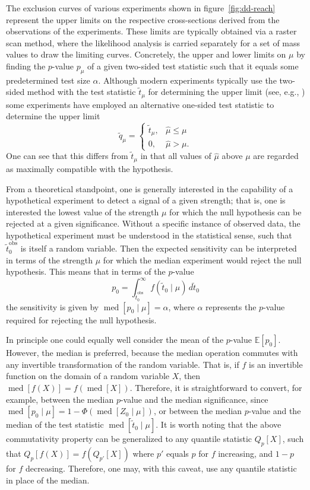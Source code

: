 \documentclass[b5paper, 10pt, twoside]{book}
\newcommand{\difd}{\,d}
\DeclareMathOperator{\med}{med}
\begin{document}
The exclusion curves of various experiments shown in figure~\ref{fig:dd-reach} represent the upper limits on the respective cross-sections derived from the observations of the experiments. These limits are typically obtained via a raster scan method, where the likelihood analysis is carried separately for a set of mass values to draw the limiting curves. Concretely, the upper and lower limits on $\mu$ by finding the $p$-value $p_\mu$ of a given two-sided test statistic such that it equals some predetermined test size $\alpha$. Although modern experiments typically use the two-sided method with the test statistic $\tilde{t}_\mu$ for determining the upper limit (see, e.g., \textcites{XENON2019b, PandaX2021, LZ2024}) some experiments have employed an alternative one-sided test statistic to determine the upper limit \parencite{CowanEtAl2011}
\begin{equation}
\tilde{q}_\mu=
\begin{cases}
\tilde{t}_\mu,&\hat{\mu}\leq\mu\\
0,&\hat{\mu}>\mu.
\end{cases}
\end{equation}
One can see that this differs from $\tilde{t}_\mu$ in that all values of $\hat{\mu}$ above $\mu$ are regarded as maximally compatible with the hypothesis.

From a theoretical standpoint, one is generally interested in the capability of a hypothetical experiment to detect a signal of a given strength; that is, one is interested the lowest value of the strength $\mu$ for which the null hypothesis can be rejected at a given significance. Without a specific instance of observed data, the hypothetical experiment must be understood in the statistical sense, such that $\tilde{t}_0^\text{obs}$ is itself a random variable. Then the expected sensitivity can be interpreted in terms of the strength $\mu$ for which the median experiment would reject the null hypothesis. This means that in terms of the $p$-value
\begin{equation}
p_0=\int_{\tilde{t}_0^\text{obs}}^\infty f(\tilde{t}_0\mid\mu)\difd\tilde{t}_0
\end{equation}
the sensitivity is given by $\med[p_0\mid\mu]=\alpha$, where $\alpha$ represents the $p$-value required for rejecting the null hypothesis.

In principle one could equally well consider the mean of the $p$-value $\mathbb{E}[p_0]$. However, the median is preferred, because the median operation commutes with any invertible transformation of the random variable. That is, if $f$ is an invertible function on the domain of a random variable $X$, then $\med[f(X)]=f(\med[X])$. Therefore, it is straightforward to convert, for example, between the median $p$-value and the median significance, since $\med[p_0\mid\mu]=1-\Phi(\med[Z_0\mid\mu])$, or between the median $p$-value and the median of the test statistic $\med[\tilde{t}_0\mid\mu]$. It is worth noting that the above commutativity property can be generalized to any quantile statistic $Q_p[X]$, such that $Q_p[f(X)]=f(Q_{p'}[X])$ where $p'$ equals $p$ for $f$ increasing, and $1-p$ for $f$ decreasing. Therefore, one may, with this caveat, use any quantile statistic in place of the median.
\end{document}
